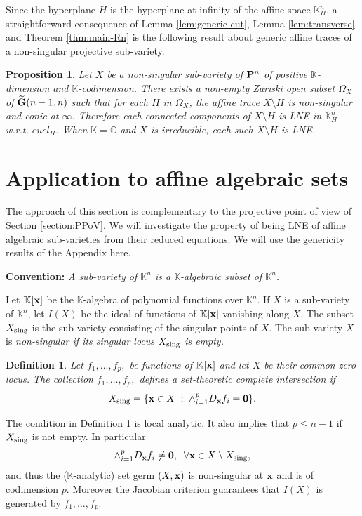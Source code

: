 \documentclass[11pt]{amsart}
\newtheorem{proposition}[theorem]{Proposition}
\newtheorem{definition}[theorem]{Definition}
\newcommand{\field}[1]{\mathbb{#1}}
\newcommand{\C}{\field{C}}
\newcommand{\K}{\field{K}}
\newcommand{\wt}[1]{\widetilde{#1}}
\newcommand{\bbo}{{\bf 0}}
\newcommand{\bG}{{\bf G}}
\newcommand{\bP}{{\bf P}}
\newcommand{\bx}{{\bf x}}
\newcommand{\Kn}{{\K^n}}
\newcommand{\sing}{{\rm sing}}
\numberwithin{equation}{section}
\numberwithin{equation}{section}
\begin{document}
\bigskip
Since the hyperplane $H$ is the hyperplane at infinity of the affine space 
$\K_H^n$, a straightforward consequence of Lemma \ref{lem:generic-cut}, Lemma
\ref{lem:transverse} and Theorem \ref{thm:main-Rn} is the following
result about generic affine traces of a non-singular projective sub-variety.
%
%
\begin{proposition}\label{prop:generic-cut-LNE-algebraic}
Let $X$ be a non-singular sub-variety of $\bP^n$ of positive $\K$-dimension and 
$\K$-codimension. 
There exists a non-empty Zariski open subset $\Omega_X$ of $\wt{\bG}(n-1,n)$ 
such that for each $H$ in $\Omega_X$, the affine trace $X\setminus H$ is 
non-singular and conic at $\infty$. Therefore each connected 
components of $X \setminus H$ is LNE in $\K_H^n$ w.r.t. $eucl_H$.
When $\K=\C$ and $X$ is irreducible, each such $X\setminus H$
is LNE.
\end{proposition}
%
%
%
%
%
%
%
%
%
%
%
%
%
%
%
%
%
%
%
%
%
%
%
%
%
%
%
% 
%
%
%
%
%
%
%
%
%
%
%
%
%
%
%
%
%
%
%
%
\section{Application to affine algebraic sets}\label{section:APoV}
%
%
The approach of this section is complementary to the projective point of 
view of Section \ref{section:PPoV}. 
We will investigate the property of being LNE of affine algebraic 
sub-varieties
from their reduced equations. We will use the genericity results of the 
Appendix here.

\bigskip\noindent
{\bf Convention:} \em A sub-variety of $\Kn$ is a $\K$-algebraic subset
of $\Kn$. 
\em

\bigskip
Let $\K[\bx]$ be the $\K$-algebra of polynomial functions over $\Kn$. If $X$ 
is a sub-variety of $\K^n$, let $I(X)$ be the ideal of functions of $\K[\bx]$
vanishing along $X$. The subset $X_\sing$ is the sub-variety consisting of 
the singular points of $X$. The sub-variety $X$ is \em  non-singular \em if 
its singular locus $X_\sing$ is empty.
%
%
\begin{definition}\label{def:geom-CI}
Let $f_1,\ldots,f_p,$ be functions of $\K[\bx]$ and let 
$X$ be their common zero locus. The collection $f_1,\ldots,f_p,$ defines  
a \em set-theoretic complete intersection \em if
$$
X_\sing  = \{ \bx \in X \; : \; \wedge_{i=1}^p D_\bx f_i = \bbo\}.
$$
\end{definition}
%
%
The condition in Definition \ref{def:geom-CI} is local analytic. 
It also implies that $p \leq n-1$ if $X_\sing$ is not empty. 
In particular
$$
\wedge_{i=1}^p D_\bx f_i \neq \bbo, \;\; \forall \bx \in X\setminus X_\sing,
$$
and thus the ($\K$-analytic) set germ $(X,\bx)$ is non-singular at $\bx$ and 
is of codimension $p$. Moreover the Jacobian criterion guarantees that 
$I(X)$ is generated by $f_1,\ldots,f_p$.
\end{document}
